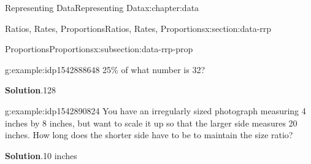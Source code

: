 \documentclass[oneside,10pt,]{book}
\newcommand{\blocktitlefont}{\relax}
\begin{document}
\begin{chapterptx}{Representing Data}{}{Representing Data}{}{}{x:chapter:data}
\begin{sectionptx}{Ratios, Rates, Proportions}{}{Ratios, Rates, Proportions}{}{}{x:section:data-rrp}
\begin{subsectionptx}{Proportions}{}{Proportions}{}{}{x:subsection:data-rrp-prop}
\begin{example}{}{g:example:idp1542888648}
25\% of what number is 32?%
\par\smallskip%
\noindent\textbf{\blocktitlefont Solution}.\hypertarget{g:solution:idp1542889416}{}\quad{}128%
\end{example}
\begin{example}{}{g:example:idp1542890824}%
You have an irregularly sized photograph measuring 4 inches by 8 inches, but want to scale it up so that the larger side measures 20 inches.  How long does the shorter side have to be to maintain the size ratio?%
\par\smallskip%
\noindent\textbf{\blocktitlefont Solution}.\hypertarget{g:solution:idp1542883272}{}\quad{}10 inches%
\end{example}
\end{subsectionptx}
\end{sectionptx}
\end{chapterptx}
\end{document}

